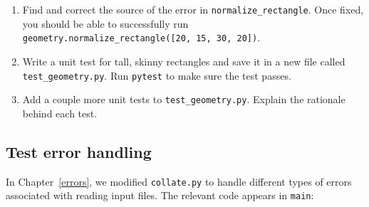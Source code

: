\documentclass[
]{krantz}
\begin{document}
\begin{enumerate}
\def\labelenumi{\arabic{enumi}.}
\setcounter{enumi}{2}
\item
  Find and correct the source of the error in \texttt{normalize\_rectangle}.
  Once fixed, you should be able to successfully run
  \texttt{geometry.normalize\_rectangle({[}20,\ 15,\ 30,\ 20{]})}.
\item
  Write a unit test for tall, skinny rectangles and save it in a new file called
  \texttt{test\_geometry.py}. Run \texttt{pytest} to make sure the test passes.
\item
  Add a couple more unit tests to \texttt{test\_geometry.py}.
  Explain the rationale behind each test.
\end{enumerate}

\hypertarget{testing-ex-error-handling}{%
\subsection{Test error handling}\label{testing-ex-error-handling}}

In Chapter~\ref{errors}, we modified \texttt{collate.py} to handle
different types of errors associated with reading input files.
The relevant code appears in \texttt{main}:
\end{document}
